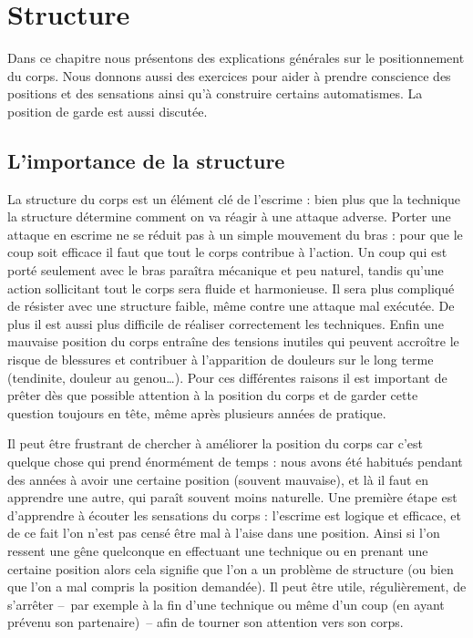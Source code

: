 \chapter{Structure}


Dans ce chapitre nous présentons des explications générales sur le positionnement du corps.
Nous donnons aussi des exercices pour aider à prendre conscience des positions et des sensations ainsi qu'à construire certains automatismes.
La position de garde est aussi discutée.


\section{L'importance de la structure}
\label{sec:structure:général}


La structure du corps est un élément clé de l'escrime : bien plus que la technique la structure détermine comment on va réagir à une attaque adverse.
Porter une attaque en escrime ne se réduit pas à un simple mouvement du bras : pour que le coup soit efficace il faut que tout le corps contribue à l'action.
Un coup qui est porté seulement avec le bras paraîtra mécanique et peu naturel, tandis qu'une action sollicitant tout le corps sera fluide et harmonieuse.
Il sera plus compliqué de résister avec une structure faible, même contre une attaque mal exécutée.
De plus il est aussi plus difficile de réaliser correctement les techniques.
Enfin une mauvaise position du corps entraîne des tensions inutiles qui peuvent accroître le risque de blessures et contribuer à l'apparition de douleurs sur le long terme (tendinite, douleur au genou…).
Pour ces différentes raisons il est important de prêter dès que possible attention à la position du corps et de garder cette question toujours en tête, même après plusieurs années de pratique.

Il peut être frustrant de chercher à améliorer la position du corps car c'est quelque chose qui prend énormément de temps : nous avons été habitués pendant des années à avoir une certaine position (souvent mauvaise), et là il faut en apprendre une autre, qui paraît souvent moins naturelle.
Une première étape est d'apprendre à écouter les sensations du corps : l'escrime est logique et efficace, et de ce fait l'on n'est pas censé être mal à l'aise dans une position.
Ainsi si l'on ressent une gêne quelconque en effectuant une technique ou en prenant une certaine position alors cela signifie que l'on a un problème de structure (ou bien que l'on a mal compris la position demandée).
Il peut être utile, régulièrement, de s'arrêter -- par exemple à la fin d'une technique ou même d'un coup (en ayant prévenu son partenaire) -- afin de tourner son attention vers son corps.

